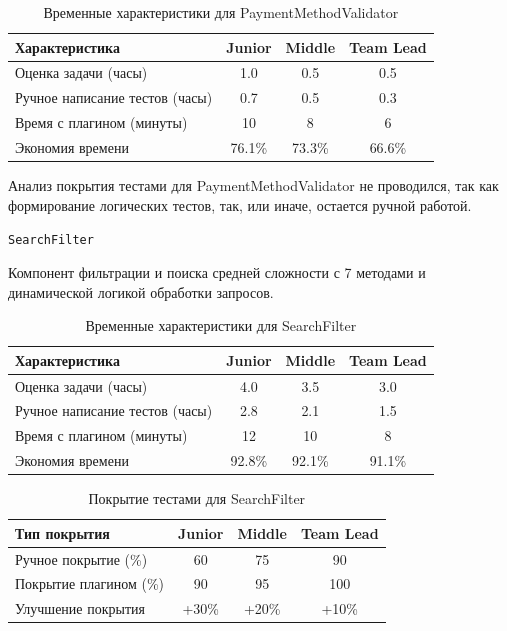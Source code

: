 \documentclass[14pt, russian]{scrartcl}
\begin{document}
\begin{table}[h!]
\centering
\begin{tabular}{|l|c|c|c|}
\hline
Характеристика & Junior & Middle & Team Lead \\
\hline
Оценка задачи (часы) & 1.0 & 0.5 & 0.5 \\
Ручное написание тестов (часы) & 0.7 & 0.5 & 0.3 \\
Время с плагином (минуты) & 10 & 8 & 6 \\
Экономия времени & 76.1\% & 73.3\% & 66.6\% \\
\hline
\end{tabular}
\vspace{1ex}
\caption{Временные характеристики для PaymentMethodValidator}
\end{table}

Анализ покрытия тестами для PaymentMethodValidator не проводился, так как формирование логических тестов, так, или иначе, остается ручной работой.

\texttt{SearchFilter}

Компонент фильтрации и поиска средней сложности с 7 методами и динамической логикой обработки запросов.

\begin{table}[h!]
\centering
\begin{tabular}{|l|c|c|c|}
\hline
Характеристика & Junior & Middle & Team Lead \\
\hline
Оценка задачи (часы) & 4.0 & 3.5 & 3.0 \\
Ручное написание тестов (часы) & 2.8 & 2.1 & 1.5 \\
Время с плагином (минуты) & 12 & 10 & 8 \\
Экономия времени & 92.8\% & 92.1\% & 91.1\% \\
\hline
\end{tabular}
\vspace{1ex}
\caption{Временные характеристики для SearchFilter}
\end{table}

\begin{table}[h!]
\centering
\begin{tabular}{|l|c|c|c|}
\hline
Тип покрытия & Junior & Middle & Team Lead \\
\hline
Ручное покрытие (\%) & 60 & 75 & 90 \\
Покрытие плагином (\%) & 90 & 95 & 100 \\
Улучшение покрытия & +30\% & +20\% & +10\% \\
\hline
\end{tabular}
\vspace{1ex}
\caption{Покрытие тестами для SearchFilter}
\end{table}
\end{document}
